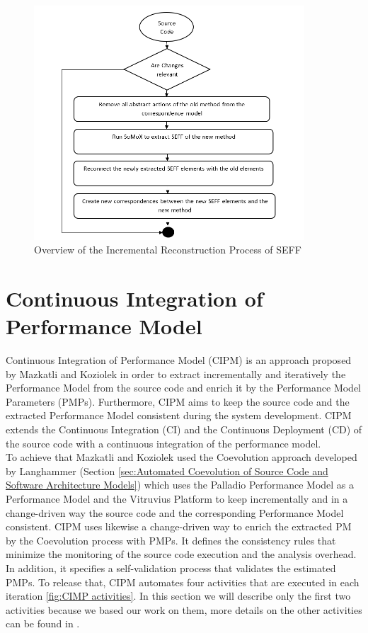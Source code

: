 \begin{figure}[h]
\centering
\includegraphics[width=0.9\textwidth]{figures/inscremental_seff_reconst}
\caption{Overview of the Incremental Reconstruction Process of SEFF}
\label{fig:seff incremental reconst}
\end{figure}


\section{Continuous Integration of Performance Model}
\label{sec:Continuous Integration of Performance Model}
Continuous Integration of Performance Model (CIPM) is an approach proposed by Mazkatli and Koziolek \cite{mazkatli2018continuous} in order to extract incrementally and iteratively the Performance Model from the source code and enrich it by the Performance Model Parameters (PMPs). Furthermore, CIPM aims to keep the source code and the extracted Performance Model consistent during the system development. CIPM extends the Continuous Integration (CI) and the Continuous Deployment (CD) of the source code with a continuous integration of the performance model.\\ 

To achieve that Mazkatli and Koziolek used the Coevolution approach developed by Langhammer (Section \ref{sec:Automated Coevolution of Source Code and Software Architecture Models}) which uses the Palladio Performance Model as a Performance Model and the Vitruvius Platform to keep incrementally and in a change-driven way the source code and the corresponding Performance Model consistent. CIPM uses likewise a change-driven way to enrich the extracted PM by the Coevolution process with PMPs. It defines the consistency rules that minimize the monitoring of the source code execution and the analysis overhead. In addition, it specifies a self-validation process that validates the estimated PMPs. To release that, CIPM automates four activities that are executed in each iteration \ref{fig:CIMP activities}. In this section we will describe only the first two activities because we based our work on them, more details on the other activities can be found in \cite{mazkatli2018continuous}.\\

